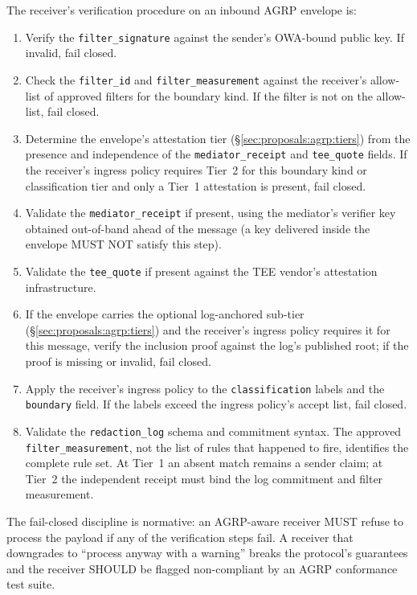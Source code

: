The receiver's verification procedure on an inbound AGRP
envelope is:

\begin{enumerate}
  \item Verify the \texttt{filter\_signature} against the
    sender's OWA-bound public key. If invalid, fail
    closed.
  \item Check the \texttt{filter\_id} and
    \texttt{filter\_measurement} against the receiver's
    allow-list of approved filters for the
    boundary kind. If the filter is not on the
    allow-list, fail closed.
  \item Determine the envelope's attestation tier
    (\S\ref{sec:proposals:agrp:tiers}) from the
    presence and independence of the
    \texttt{mediator\_receipt} and \texttt{tee\_quote}
    fields. If the receiver's ingress policy requires
    Tier~2 for this boundary kind or classification
    tier and only a Tier~1 attestation is present, fail
    closed.
  \item Validate the \texttt{mediator\_receipt} if
    present, using the mediator's verifier key obtained
    out-of-band ahead of the message (a
    key delivered inside the envelope MUST NOT satisfy
    this step).
  \item Validate the \texttt{tee\_quote} if present
    against the TEE vendor's attestation
    infrastructure.
  \item If the envelope carries the optional
    log-anchored sub-tier
    (\S\ref{sec:proposals:agrp:tiers}) and the
    receiver's ingress policy requires it for this
    message, verify the inclusion proof against the
    log's published root; if the proof is missing or
    invalid, fail closed.
  \item Apply the receiver's ingress policy to the
    \texttt{classification} labels and the
    \texttt{boundary} field. If the labels exceed the
    ingress policy's accept list, fail closed.
  \item Validate the \texttt{redaction\_log} schema and
    commitment syntax. The approved
    \texttt{filter\_measurement}, not the list of rules
    that happened to fire, identifies the complete rule
    set. At Tier~1 an absent match remains a sender claim;
    at Tier~2 the independent receipt must bind the log
    commitment and filter measurement.
\end{enumerate}

The fail-closed discipline is normative: an AGRP-aware
receiver MUST refuse to process the payload if any of
the verification steps fail. A receiver that downgrades
to ``process anyway with a warning'' breaks the
protocol's guarantees and the receiver SHOULD be flagged
non-compliant by an AGRP conformance test suite.

